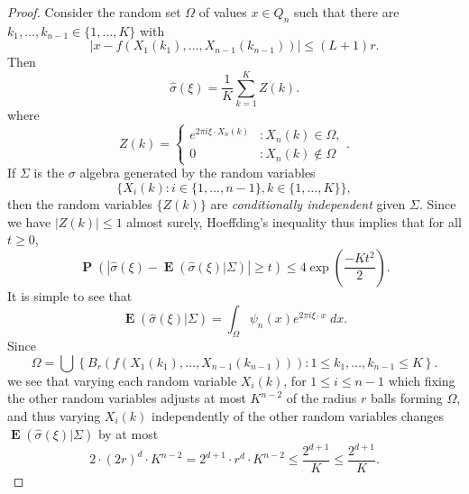 \documentclass[12pt,reqno]{article}
\numberwithin{equation}{section}
\numberwithin{theorem}{section}
\DeclareMathOperator{\EE}{\mathbf{E}}
\DeclareMathOperator{\PP}{\mathbf{P}}
\begin{document}
\begin{proof}
    Consider the random set $\Omega$ of values $x \in Q_n$ such that there are $k_1,\dots,k_{n-1} \in \{ 1,\dots,K \}$ with
    \begin{equation}
        |x - f(X_1(k_1),\dots,X_{n-1}(k_{n-1}))| \leq (L+1)r.
    \end{equation}
    Then
    \begin{equation}
        \widehat{\sigma}(\xi) = \frac{1}{K} \sum_{k = 1}^K Z(k).
    \end{equation}
    where
    \[ Z(k) = \begin{cases} e^{2 \pi i \xi \cdot X_n(k)} &: X_n(k) \in \Omega, \\ 0 &: X_n(k) \not \in \Omega \end{cases}. \]
    If $\Sigma$ is the $\sigma$ algebra generated by the random variables
    \[ \{ X_i(k) : i \in \{ 1, \dots, n-1 \}, k \in \{ 1, \dots, K \} \}, \]
    then the random variables $\{ Z(k) \}$ are \emph{conditionally independent} given $\Sigma$. Since we have $|Z(k)| \leq 1$ almost surely, Hoeffding's inequality thus implies that for all $t \geq 0$,
    \begin{equation} \label{equationCOIJCOIJX1232312}
        \PP \left( \left| \widehat{\sigma}(\xi) - \EE(\widehat{\sigma}(\xi)|\Sigma) \right| \geq t \right) \leq 4 \exp \left( \frac{-K t^2}{2} \right).
    \end{equation}
    It is simple to see that
    \begin{equation}
        \EE(\widehat{\sigma}(\xi) | \Sigma) = \int_\Omega \psi_n(x) e^{2 \pi i \xi \cdot x}\; dx.
    \end{equation}
    Since
    \begin{equation}
        \Omega = \bigcup \left\{ B_r(f(X_1(k_1),\dots,X_{n-1}(k_{n-1}))) : 1 \leq k_1,\dots,k_{n-1} \leq K \right\}.
    \end{equation}
    we see that varying each random variable $X_i(k)$, for $1 \leq i \leq n-1$ which fixing the other random variables adjusts at most $K^{n-2}$ of the radius $r$ balls forming $\Omega$, and thus varying $X_i(k)$ independently of the other random variables changes $\EE(\widehat{\sigma}(\xi)|\Sigma)$ by at most
    \begin{equation}
        2 \cdot (2r)^d \cdot K^{n-2} = 2^{d+1} \cdot r^d \cdot K^{n-2} \leq \frac{2^{d+1}}{K} \leq \frac{2^{d+1}}{K}.
    \end{equation}

\end{proof}
\end{document}
